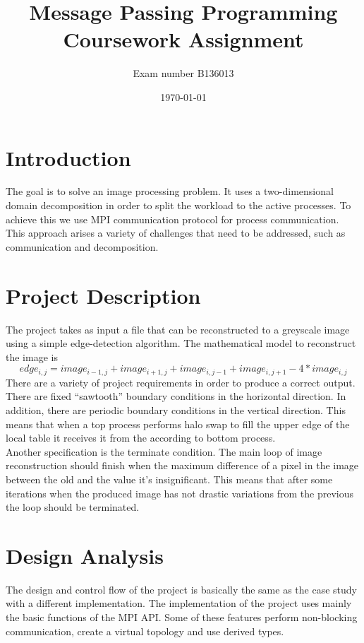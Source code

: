 \documentclass[12pt,a4paper]{article}
\newcommand{\sectionVspacing}{\vspace{15pt}}
\begin{document}
\title{Message Passing Programming Coursework Assignment}
\author{Exam number B136013}
\date{\today}

\makeEPCCtitle

\thispagestyle{empty}

\newpage
\clearpage

\tableofcontents

\newpage
\clearpage

\section{Introduction}
	The goal is to solve an image processing problem. It uses a two-dimensional domain decomposition in order to split the workload to the active processes. To achieve this we use MPI communication protocol for process communication. This approach arises a variety of challenges that need to be addressed, such as communication and decomposition.

\sectionVspacing

\section{Project Description}
  The project takes as input a file that can be reconstructed to a greyscale image using a simple edge-detection algorithm. The mathematical model to reconstruct the image is\\
  \begin{equation}
  edge_{i, j} = image_{i-1, j} + image_{i+1, j} + image_{i, j-1} + image_{i, j+1} - 4*image_{i, j}
  \end{equation}
  There are a variety of project requirements in order to produce a correct output. There are fixed “sawtooth” boundary conditions in the horizontal direction. In addition, there are periodic boundary conditions in the vertical direction. This means that when a top process performs halo swap to fill the upper edge of the local table it receives it from the according to bottom process.\\
  Another specification is the terminate condition. The main loop of image reconstruction should finish when the maximum difference of a pixel in the image between the old and the value it's insignificant. This means that after some iterations when the produced image has not drastic variations from the previous the loop should be terminated.

\sectionVspacing

\section{Design Analysis}
	The design and control flow of the project is basically the same as the case study with a different implementation. The implementation of the project uses mainly the basic functions of the MPI API. Some of these features perform non-blocking communication, create a virtual topology and use derived types.
\end{document}
